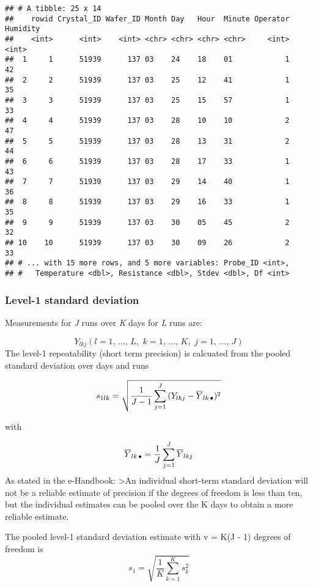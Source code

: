 \documentclass[]{book}
\theoremstyle{definition}
\theoremstyle{definition}
\theoremstyle{definition}
\theoremstyle{remark}
\begin{document}
\begin{verbatim}
## # A tibble: 25 x 14
##    rowid Crystal_ID Wafer_ID Month Day   Hour  Minute Operator Humidity
##    <int>      <int>    <int> <chr> <chr> <chr> <chr>     <int>    <int>
##  1     1      51939      137 03    24    18    01            1       42
##  2     2      51939      137 03    25    12    41            1       35
##  3     3      51939      137 03    25    15    57            1       33
##  4     4      51939      137 03    28    10    10            2       47
##  5     5      51939      137 03    28    13    31            2       44
##  6     6      51939      137 03    28    17    33            1       43
##  7     7      51939      137 03    29    14    40            1       36
##  8     8      51939      137 03    29    16    33            1       35
##  9     9      51939      137 03    30    05    45            2       32
## 10    10      51939      137 03    30    09    26            2       33
## # ... with 15 more rows, and 5 more variables: Probe_ID <int>,
## #   Temperature <dbl>, Resistance <dbl>, Stdev <dbl>, Df <int>
\end{verbatim}

\hypertarget{level-1-standard-deviation}{%
\subsubsection{Level-1 standard
deviation}\label{level-1-standard-deviation}}

Measurements for \emph{J} runs over \emph{K} days for \emph{L} runs are:

\[
Y_{lkj}(l = 1, \, \ldots, \, L, \,\, k=1, \,\ldots, \, K, \,\, j=1, \,\ldots, \, J)
\] The level-1 repeatability (short term precision) is calcuated from
the pooled standard deviation over days and runs

\[
s_{1lk} = \sqrt{\frac{1}{J-1} \sum_{j=1}^{J}{(Y_{lkj} - \overline{Y}_{lk{\small \, \bullet}})^2}}
\]

with

\[
\overline{Y}_{lk{\small \, \bullet}} = \frac{1}{J}\sum_{j=1}^{J}{\overline{Y}_{lkj}}
\] As stated in the e-Handbook: \textgreater{}An individual short-term
standard deviation will not be a reliable estimate of precision if the
degrees of freedom is less than ten, but the individual estimates can be
pooled over the K days to obtain a more reliable estimate.

The pooled level-1 standard deviation estimate with v = K(J - 1) degrees
of freedom is \[
s_1 = \sqrt{\frac{1}{K} \sum_{k=1}^{K} s_k^2}
\]
\end{document}
